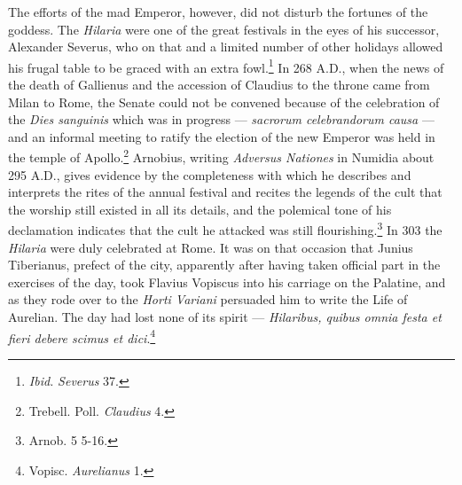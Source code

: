 \documentclass[a4paper, 11pt, oneside, polutonikogreek, english]{article}
\begin{document}
The efforts of the mad Emperor, however, did not disturb the fortunes of the goddess. The \emph{Hilaria} were one of the great festivals in the eyes of his successor, Alexander Severus, who on that and a limited number of other holidays allowed his frugal table to be graced with an extra fowl.\footnote{\emph{Ibid.} \emph{Severus} 37.} In 268 \textsc{A.D.}, when the news of the death of Gallienus and the accession of Claudius to the throne came from Milan to Rome, the Senate could not be convened because of the celebration of the \emph{Dies sanguinis} which was in progress --- \emph{sacrorum celebrandorum causa} --- and an informal meeting to ratify the election of the new Emperor was held in the temple of Apollo.\footnote{Trebell. Poll. \emph{Claudius} 4.} Arnobius, writing \emph{Adversus Nationes} in Numidia about 295 \textsc{A.D.}, gives evidence by the completeness with which he describes and interprets the rites of the annual festival and recites the legends of the cult that the worship still existed in all its details, and the polemical tone of his declamation indicates that the cult he attacked was still flourishing.\footnote{Arnob. 5 5-16.} In 303 the \emph{Hilaria} were duly celebrated at Rome. It was on that occasion that Junius Tiberianus, prefect of the city, apparently after having taken official part in the exercises of the day, took Flavius Vopiscus into his carriage on the Palatine, and as they rode over to the \emph{Horti Variani} persuaded him to write the Life of Aurelian. The day had lost none of its spirit --- \emph{Hilaribus, quibus omnia festa et fieri debere scimus et dici}.\footnote{Vopisc. \emph{Aurelianus} 1.}
\end{document}
